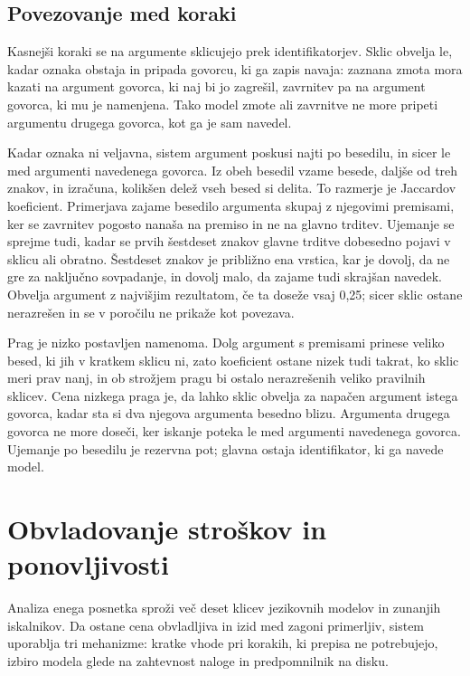 \documentclass[a4paper, 12pt]{book}
\begin{document}
\subsection{Povezovanje med koraki}
\label{ssec:povezovanje}

Kasnejši koraki se na argumente sklicujejo prek identifikatorjev. Sklic obvelja
le, kadar oznaka obstaja in pripada govorcu, ki ga zapis navaja: zaznana zmota
mora kazati na argument govorca, ki naj bi jo zagrešil, zavrnitev pa na argument
govorca, ki mu je namenjena. Tako model zmote ali zavrnitve ne more pripeti
argumentu drugega govorca, kot ga je sam navedel.

Kadar oznaka ni veljavna, sistem argument poskusi najti po besedilu, in sicer
le med argumenti navedenega govorca. Iz obeh besedil vzame besede, daljše od
treh znakov, in izračuna, kolikšen delež vseh besed si delita. To razmerje je
Jaccardov koeficient. Primerjava zajame besedilo argumenta skupaj z njegovimi
premisami, ker se zavrnitev pogosto nanaša na premiso in ne na glavno trditev.
Ujemanje se sprejme tudi, kadar se prvih šestdeset znakov glavne trditve
dobesedno pojavi v sklicu ali obratno. Šestdeset znakov je približno ena
vrstica, kar je dovolj, da ne gre za naključno sovpadanje, in dovolj malo, da
zajame tudi skrajšan navedek. Obvelja argument z najvišjim rezultatom, če ta
doseže vsaj 0,25; sicer sklic ostane nerazrešen in se v poročilu ne prikaže kot
povezava.

Prag je nizko postavljen namenoma. Dolg argument s premisami prinese veliko
besed, ki jih v kratkem sklicu ni, zato koeficient ostane nizek tudi takrat, ko
sklic meri prav nanj, in ob strožjem pragu bi ostalo nerazrešenih veliko
pravilnih sklicev. Cena nizkega praga je, da lahko sklic obvelja za napačen
argument istega govorca, kadar sta si dva njegova argumenta besedno blizu.
Argumenta drugega govorca ne more doseči, ker iskanje poteka le med argumenti
navedenega govorca. Ujemanje po besedilu je rezervna pot; glavna ostaja
identifikator, ki ga navede model.

\section{Obvladovanje stroškov in ponovljivosti}
\label{sec:stroski}

Analiza enega posnetka sproži več deset klicev jezikovnih modelov in zunanjih
iskalnikov. Da ostane cena obvladljiva in izid med zagoni primerljiv, sistem
uporablja tri mehanizme: kratke vhode pri korakih, ki prepisa ne potrebujejo,
izbiro modela glede na zahtevnost naloge in predpomnilnik na disku.
\end{document}
